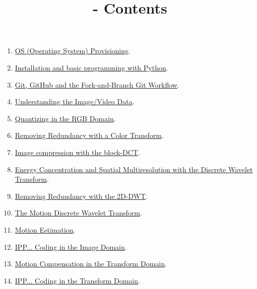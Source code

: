 
\title{\SM - Contents}

\maketitle

\begin{enumerate}
\item \href{https://sistemas-multimedia.github.io/milestones/01-provisioning/}{OS (Operating System) Provisioning}.
\item \href{https://sistemas-multimedia.github.io/milestones/02-python/}{Installation and basic programming with Python}.
\item \href{https://sistemas-multimedia.github.io/milestones/03-git/}{Git, GitHub and the Fork-and-Branch Git Workflow}.
\item \href{https://sistemas-multimedia.github.io/milestones/04-the_data/}{Understanding the Image/Video Data}.
\item \href{https://sistemas-multimedia.github.io/milestones/05-quantization/}{Quantizing in the RGB Domain}.
\item \href{https://sistemas-multimedia.github.io/milestones/06-color_transform/}{Removing Redundancy with a Color Transform}.
\item \href{https://sistemas-multimedia.github.io/milestones/07-DCT/}{Image compression with the block-DCT}.
\item \href{https://sistemas-multimedia.github.io/milestones/07-DWT/}{Energy Concentration and Spatial Multiresolution with the Discrete Wavelet Transform}.
\item \href{https://sistemas-multimedia.github.io/milestones/08-2D-DWT/}{Removing Redundancy with the 2D-DWT}.
\item \href{https://sistemas-multimedia.github.io/milestones/09-MDWT/}{The Motion Discrete Wavelet Transform}.
\item \href{https://sistemas-multimedia.github.io/milestones/10-ME/}{Motion Estimation}.
\item \href{https://sistemas-multimedia.github.io/milestones/11-image_domain_IPP/}{IPP... Coding in the Image Domain}.
\item \href{https://sistemas-multimedia.github.io/milestones/12-transform_domain_MC/}{Motion Compensation in the Transform Domain}.
\item \href{https://sistemas-multimedia.github.io/milestones/13-transform_domain_IPP/}{IPP... Coding in the Transform Domain}.

\end{enumerate}
